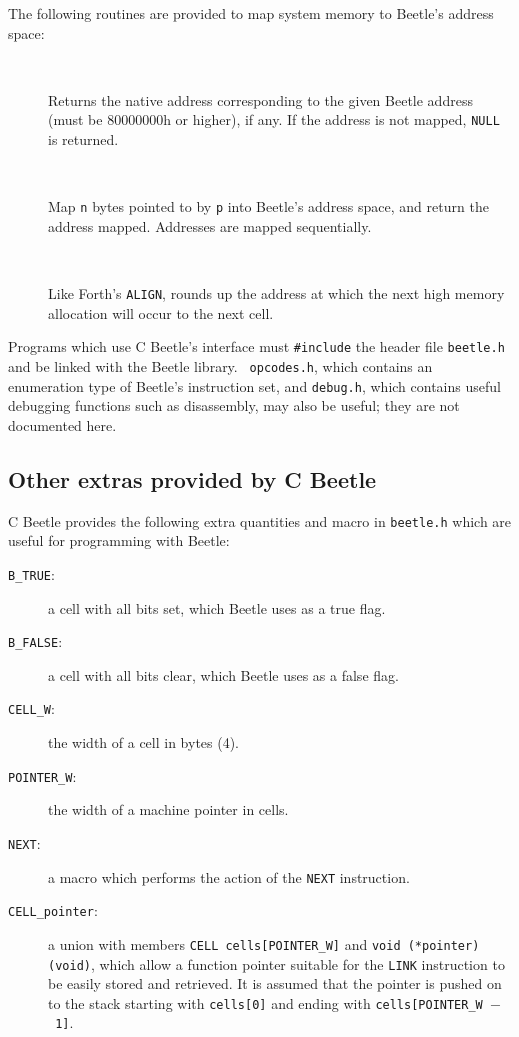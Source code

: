\documentclass{article}
\newlength{\ifacewidth}\ifacewidth=\textwidth \advance\ifacewidth by -0.1in
\newlength{\innerwidth}\innerwidth=\ifacewidth \advance\innerwidth by -0.5in
\newcommand{\ifacec}[2]{\item[]\parbox{\ifacewidth}{\hspace*{2.5mm}{\tt #1}\\[0.5ex]\hspace*{0.4in}\parbox{\innerwidth}{#2}}}
\begin{document}
The following routines are provided to map system memory to Beetle’s address space:

\begin{description}
\ifacec{uint8\_t *himem\_addr(UCELL addr)}{Returns the native address corresponding to the given Beetle address (must be 80000000h or higher), if any. If the address is not mapped, {\tt NULL} is returned.}
\ifacec{UCELL himem\_allot(void *p, size\_t n)}{Map {\tt n} bytes pointed to by {\tt p} into Beetle’s address space, and return the address mapped. Addresses are mapped sequentially.}
\ifacec{UCELL himem\_align(void)}{Like Forth’s {\tt ALIGN}, rounds up the address at which the next high memory allocation will occur to the next cell.}
\end{description}

Programs which use C Beetle's interface must {\tt \#include} the header file
{\tt beetle.h} and be linked with the Beetle library. {\tt
opcodes.h}, which contains an enumeration type of Beetle's instruction set,
and {\tt debug.h}, which contains useful debugging functions such as
disassembly, may also be useful; they are not documented here.


\subsection{Other extras provided by C Beetle}

C Beetle provides the following extra quantities and macro in {\tt beetle.h}
which are useful for programming with Beetle:

\begin{description}
\item[{\tt B\_TRUE}:] a cell with all bits set, which Beetle uses as a true
flag.
\item[{\tt B\_FALSE}:] a cell with all bits clear, which Beetle uses as a
false flag.
\item[{\tt CELL\_W}:] the width of a cell in bytes (4).
\item[{\tt POINTER\_W}:] the width of a machine pointer in cells.
\item[{\tt NEXT}:] a macro which performs the action of the {\tt NEXT}
instruction.
\item[{\tt CELL\_pointer}:] a union with members {\tt CELL cells[POINTER\_W]} and {\tt void (*pointer)(void)}, which allow a function pointer suitable for the {\tt LINK} instruction to be easily stored and retrieved. It is assumed that the pointer is pushed on to the stack starting with {\tt cells[0]} and ending with {\tt cells[POINTER\_W~$-$~1]}.
\end{description}




\end{document}
